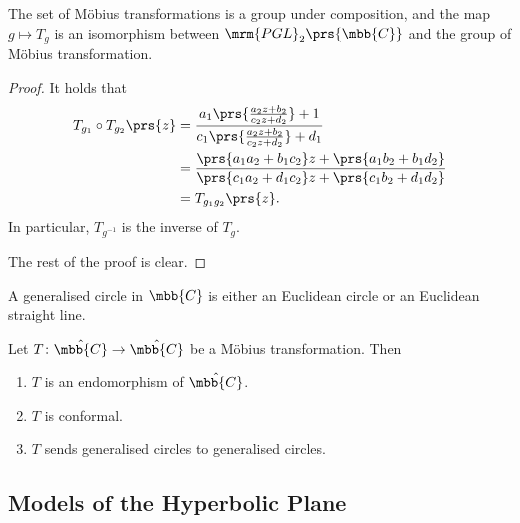 \documentclass[10pt, twoside]{book}
\begin{document}
\begin{lemma}
The set of Möbius transformations is a group under composition, and the map $g \mapsto T_g$ is an isomorphism between $\mrm{PGL}_2\prs{\mbb{C}}$ and the group of Möbius transformation.
\end{lemma}

\begin{proof}
It holds that
\begin{align*}
T_{g_1} \circ T_{g_2} \prs{z} &=  \frac{a_1 \prs{\frac{a_2 z + b_2}{c_2 z + d_2}} + 1}{c_1 \prs{\frac{a_2 z + b_2}{c_2 z + d_2}} + d_1}
\\&= \frac{\prs{a_1 a_2 + b_1 c_2} z + \prs{a_1 b_2 + b_1 d_2}}{\prs{c_1 a_2 + d_1 c_2} z + \prs{c_1 b_2 + d_1 d_2}}
\\&= T_{g_1 g_2}\prs{z} \text{.}
\end{align*}
In particular, $T_{g^{-1}}$ is the inverse of $T_g$.

The rest of the proof is clear.
\end{proof}

\begin{definition}
A generalised circle in $\mbb{C}$ is either an Euclidean circle or an Euclidean straight line.
\end{definition}

\begin{lemma}
Let $T \colon \hat{\mbb{C}} \to \hat{\mbb{C}}$ be a Möbius transformation. Then
\begin{enumerate}
\item $T$ is an endomorphism of $\hat{\mbb{C}}$.
\item $T$ is conformal.
\item $T$ sends generalised circles to generalised circles.
\end{enumerate}
\end{lemma}

\subsection{Models of the Hyperbolic Plane}
\end{document}
